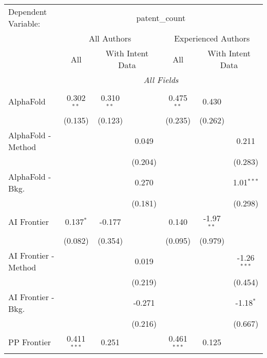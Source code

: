 \begingroup
\centering
\begin{tabular}{lcccccc}
   \tabularnewline \midrule \midrule
   Dependent Variable: & \multicolumn{6}{c}{patent\_count}\\
 & \multicolumn{3}{c}{All Authors} & \multicolumn{3}{c}{Experienced Authors} \\
\cmidrule(lr){2-4} \cmidrule(lr){5-7}
 & \multicolumn{1}{c}{All} & \multicolumn{2}{c}{With Intent Data} & \multicolumn{1}{c}{All} & \multicolumn{2}{c}{With Intent Data} \\
\cmidrule(lr){2-2} \cmidrule(lr){3-4} \cmidrule(lr){5-5} \cmidrule(lr){6-7}
 & \multicolumn{6}{c}{\textit{All Fields}} \\ \\
   AlphaFold            & 0.302$^{**}$  & 0.310$^{**}$ &         & 0.475$^{**}$  & 0.430        &   \\   
                        & (0.135)       & (0.123)      &         & (0.235)       & (0.262)      &   \\   
   AlphaFold - Method   &               &              & 0.049   &               &              & 0.211\\   
                        &               &              & (0.204) &               &              & (0.283)\\   
   AlphaFold - Bkg.     &               &              & 0.270   &               &              & 1.01$^{***}$\\   
                        &               &              & (0.181) &               &              & (0.298)\\   
   AI Frontier          & 0.137$^{*}$   & -0.177       &         & 0.140         & -1.97$^{**}$ &   \\   
                        & (0.082)       & (0.354)      &         & (0.095)       & (0.979)      &   \\   
   AI Frontier - Method &               &              & 0.019   &               &              & -1.26$^{***}$\\   
                        &               &              & (0.219) &               &              & (0.454)\\   
   AI Frontier - Bkg.   &               &              & -0.271  &               &              & -1.18$^{*}$\\   
                        &               &              & (0.216) &               &              & (0.667)\\   
   PP Frontier          & 0.411$^{***}$ & 0.251        &         & 0.461$^{***}$ & 0.125        &   \\   

\end{tabular}
